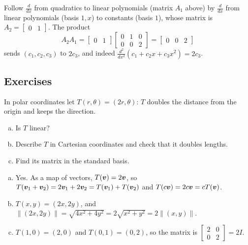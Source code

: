 \begin{example}\label{ex:u34-second}
Follow $\frac{d}{dx}$ from quadratics to linear polynomials (matrix $A_1$ above) by
$\frac{d}{dx}$ from linear polynomials (basis $1,x$) to constants (basis $1$), whose matrix is
$A_2=\begin{bmatrix}0&1\end{bmatrix}$. The product
\[
  A_2A_1=\begin{bmatrix}0&1\end{bmatrix}\begin{bmatrix}0&1&0\\0&0&2\end{bmatrix}=\begin{bmatrix}0&0&2\end{bmatrix}
\]
sends $(c_1,c_2,c_3)$ to $2c_3$, and indeed $\frac{d^2}{dx^2}(c_1+c_2x+c_3x^2)=2c_3$.
\end{example}

\subsection{Exercises}

\begin{exercise}\label{exr:u34-polar}
In polar coordinates let $T(r,\theta)=(2r,\theta)$: $T$ doubles the distance from the origin and keeps
the direction.
\begin{enumerate}[(a)]
  \item Is $T$ linear?
  \item Describe $T$ in Cartesian coordinates and check that it doubles lengths.
  \item Find its matrix in the standard basis.
\end{enumerate}
\end{exercise}
\begin{solution}
\begin{enumerate}[(a)]
  \item Yes. As a map of vectors, $T(\boldsymbol{v})=2\boldsymbol{v}$, so $T(\boldsymbol{v}_1+\boldsymbol{v}_2)=2\boldsymbol{v}_1+2\boldsymbol{v}_2=T(\boldsymbol{v}_1)+T(\boldsymbol{v}_2)$ and
        $T(c\boldsymbol{v})=2c\boldsymbol{v}=cT(\boldsymbol{v})$.
  \item $T(x,y)=(2x,2y)$, and $\|(2x,2y)\|=\sqrt{4x^2+4y^2}=2\sqrt{x^2+y^2}=2\|(x,y)\|$.
  \item $T(1,0)=(2,0)$ and $T(0,1)=(0,2)$, so the matrix is
        $\left[\begin{smallmatrix}2&0\\0&2\end{smallmatrix}\right]=2I$.
\end{enumerate}
\end{solution}

